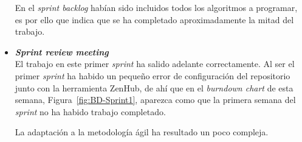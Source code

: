 \begin{itemize}
En el \textit{sprint backlog} habían sido incluidos todos los algoritmos a programar, es por ello que indica que se ha completado aproximadamente la mitad del trabajo.

\item \textbf{\textit{Sprint review meeting}}\\
El trabajo en este primer \textit{sprint} ha salido adelante correctamente. Al ser el primer \textit{sprint} ha habido un pequeño error de configuración del repositorio junto con la herramienta ZenHub, de ahí que en el \textit{burndown chart} de esta semana, Figura~\ref{fig:BD-Sprint1}, aparezca como que la primera semana del \textit{sprint} no ha habido trabajo completado.

La adaptación a la metodología ágil ha resultado un poco compleja.
\end{itemize}

